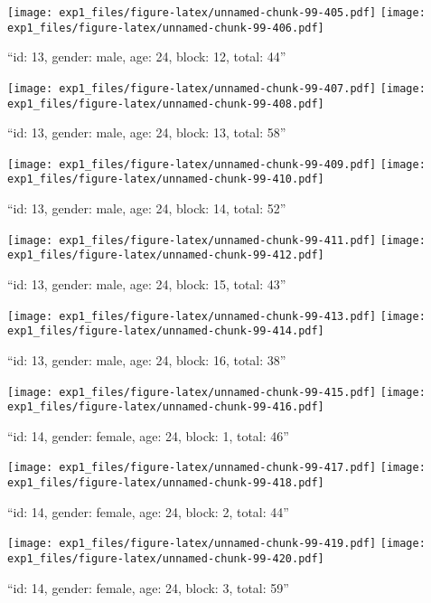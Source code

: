 \documentclass[,]{article}
\begin{document}
\texttt{[image: exp1\_files/figure-latex/unnamed-chunk-99-405.pdf]}
\texttt{[image: exp1\_files/figure-latex/unnamed-chunk-99-406.pdf]}

\newpage
[1] 

``id: 13, gender: male, age: 24, block: 12, total: 44''

\texttt{[image: exp1\_files/figure-latex/unnamed-chunk-99-407.pdf]}
\texttt{[image: exp1\_files/figure-latex/unnamed-chunk-99-408.pdf]}

\newpage
[1] 

``id: 13, gender: male, age: 24, block: 13, total: 58''

\texttt{[image: exp1\_files/figure-latex/unnamed-chunk-99-409.pdf]}
\texttt{[image: exp1\_files/figure-latex/unnamed-chunk-99-410.pdf]}

\newpage
[1] 

``id: 13, gender: male, age: 24, block: 14, total: 52''

\texttt{[image: exp1\_files/figure-latex/unnamed-chunk-99-411.pdf]}
\texttt{[image: exp1\_files/figure-latex/unnamed-chunk-99-412.pdf]}

\newpage
[1] 

``id: 13, gender: male, age: 24, block: 15, total: 43''

\texttt{[image: exp1\_files/figure-latex/unnamed-chunk-99-413.pdf]}
\texttt{[image: exp1\_files/figure-latex/unnamed-chunk-99-414.pdf]}

\newpage
[1] 

``id: 13, gender: male, age: 24, block: 16, total: 38''

\texttt{[image: exp1\_files/figure-latex/unnamed-chunk-99-415.pdf]}
\texttt{[image: exp1\_files/figure-latex/unnamed-chunk-99-416.pdf]}

\newpage
[1] 

``id: 14, gender: female, age: 24, block: 1, total: 46''

\texttt{[image: exp1\_files/figure-latex/unnamed-chunk-99-417.pdf]}
\texttt{[image: exp1\_files/figure-latex/unnamed-chunk-99-418.pdf]}

\newpage
[1] 

``id: 14, gender: female, age: 24, block: 2, total: 44''

\texttt{[image: exp1\_files/figure-latex/unnamed-chunk-99-419.pdf]}
\texttt{[image: exp1\_files/figure-latex/unnamed-chunk-99-420.pdf]}

\newpage
[1] 

``id: 14, gender: female, age: 24, block: 3, total: 59''
\end{document}
